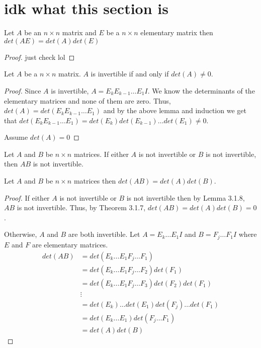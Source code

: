 \section{idk what this section is}
\begin{lemma}
    Let $A$ be an $n\times n$ matrix and $E$ be a $n\times n$ elementary matrix then $det(AE)=det(A)det(E)$
\end{lemma}
\begin{proof}
    just check lol
\end{proof}
\begin{theorem}
    Let $A$ be a $n\times n$ matrix. $A$ is invertible if and only if $det(A)\neq 0$.
\end{theorem}
\begin{proof}
    Since $A$ is invertible, $A=E_kE_{k-1}\ldots E_1 I$. We know the determinants of the elementary matrices and none of them are zero. Thus, $det(A)=det(E_k E_{k-1}\ldots E_1)$ and by the above lemma and induction we get that $det(E_k E_{k-1}\ldots E_1)=det(E_k)det(E_{k-1})\ldots det(E_1)\neq 0$.

    Assume $det(A)=0$
\end{proof}
\begin{lemma}
    Let $A$ and $B$ be $n\times n$ matrices. If either $A$ is not invertible or $B$ is not invertible, then $AB$ is not invertible.
\end{lemma}
\begin{theorem}
    Let $A$ and $B$ be $n\times n$ matrices then $det(AB)=det(A)det(B)$.
\end{theorem}
\begin{proof}
    If either $A$ is not invertible or $B$ is not invertible then by Lemma 3.1.8, $AB$ is not invertible. Thus, by Theorem 3.1.7, $det(AB)=det(A)det(B)=0$.

    Otherwise, $A$ and $B$ are both invertible. Let $A=E_k\ldots E_1I$ and $B=F_j\ldots F_1I$ where $E$ and $F$ are elementary matrices.
    \begin{align*}
        det(AB)&=det(E_k\ldots E_1 F_j\ldots F_1)\\
        &=det(E_k\ldots E_1F_j\ldots F_2)det(F_1)\tag{by Lemma 18.6}\\
        &=det(E_k\ldots E_1F_j\ldots F_3)det(F_2)det(F_1)\tag{by Lemma 18.6}\\
        &\vdots\\
        &=det(E_k)\ldots det(E_1)det(F_j)\ldots det(F_1)\\
        &=det(E_k\ldots E_1)det(F_j\ldots F_1)\\
        &=det(A)det(B)
    \end{align*}
\end{proof}
